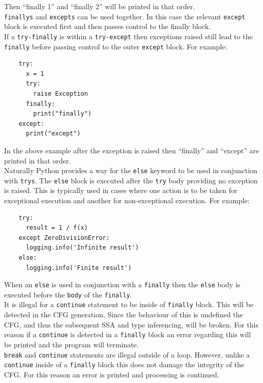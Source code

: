 \documentclass[12pt, titlepage]{article}
\begin{document}
Then ``finally 1'' and ``finally 2'' will be printed in that order. \\
\indent \texttt{finallys} and \texttt{excepts} can be used together. In this case the relevant \texttt{except} block is executed first and then passes control to the finally block. \\
\indent If a \texttt{try-finally} is within a \texttt{try-except} then exceptions raised still lead to the \texttt{finally} before passing control to the outer \texttt{except} block. For example:
\begin{lstlisting}
    try:
      x = 1
      try:
        raise Exception
      finally:
        print("finally")
    except:
      print("except")
\end{lstlisting}
In the above example after the exception is raised then ``finally'' and ``except'' are printed in that order. \\
\indent Naturally Python provides a way for the \texttt{else} keyword to be used in conjunction with \texttt{trys}. The \texttt{else} block is executed after the \texttt{try} body providing no exception is raised. This is typically used in cases where one action is to be taken for exceptional execution and another for non-exceptional execution. For example:
\begin{lstlisting}
    try:
      result = 1 / f(x)
    except ZeroDivisionError:
      logging.info('Infinite result')
    else:
      logging.info('Finite result')
\end{lstlisting}
When an \texttt{else} is used in conjunction with a \texttt{finally} then the \texttt{else} body is executed before the \texttt{body} of the \texttt{finally}. \\
\indent It is illegal for a \texttt{continue} statement to be inside of \texttt{finally} block. This will be detected in the CFG generation. Since the behaviour of this is undefined the CFG, and thus the subsequent SSA and type inferencing, will be broken. For this reason if a \texttt{continue} is detected in a \texttt{finally} block an error regarding this will be printed and the program will terminate. \\
\indent \texttt{break} and \texttt{continue} statements are illegal outside of a loop. However, unlike a \texttt{continue} inside of a \texttt{finally} block this does not damage the integrity of the CFG. For this reason an error is printed and processing is continued.
\end{document}
